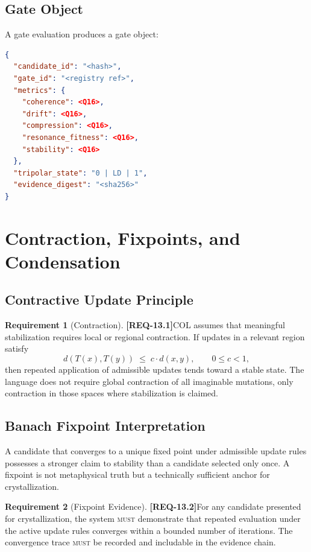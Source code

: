 \documentclass[11pt,a4paper,twoside]{article}
\theoremstyle{definition}
\newtheorem{requirement}{Requirement}[section]
\theoremstyle{remark}
\newcommand{\req}[1]{\textbf{\textcolor{reqred}{[REQ-#1]}}}
\newcommand{\must}{\textsc{must}}
\begin{document}
\subsection{Gate Object}

A gate evaluation produces a gate object:
\begin{lstlisting}[language=JSON,caption={Gate Object Schema}]
{
  "candidate_id": "<hash>",
  "gate_id": "<registry ref>",
  "metrics": {
    "coherence": <Q16>,
    "drift": <Q16>,
    "compression": <Q16>,
    "resonance_fitness": <Q16>,
    "stability": <Q16>
  },
  "tripolar_state": "0 | LD | 1",
  "evidence_digest": "<sha256>"
}
\end{lstlisting}



\section{Contraction, Fixpoints, and Condensation}
\label{sec:contraction}

\subsection{Contractive Update Principle}

\begin{requirement}[Contraction]
\label{req:contraction}
\req{13.1}\quad COL assumes that meaningful stabilization requires local or regional contraction. If updates in a relevant region satisfy
\[
  d(T(x), T(y)) \;\leq\; c \cdot d(x, y), \qquad 0 \leq c < 1,
\]
then repeated application of admissible updates tends toward a stable state. The language does not require global contraction of all imaginable mutations, only contraction in those spaces where stabilization is claimed.
\end{requirement}

\subsection{Banach Fixpoint Interpretation}

A candidate that converges to a unique fixed point under admissible update rules possesses a stronger claim to stability than a candidate selected only once. A fixpoint is not metaphysical truth but a technically sufficient anchor for crystallization.

\begin{requirement}[Fixpoint Evidence]
\label{req:fixpoint}
\req{13.2}\quad For any candidate presented for crystallization, the system \must{} demonstrate that repeated evaluation under the active update rules converges within a bounded number of iterations. The convergence trace \must{} be recorded and includable in the evidence chain.
\end{requirement}
\end{document}
